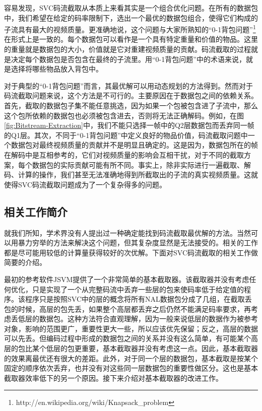 容易发现，SVC码流截取从本质上来看其实是一个组合优化问题。在所有的数据包中，我们希望在给定的码率限制下，选出一个最优的数据包组合，使得它们构成的子流具有最大的视频质量。更准确地说，这个问题与大家所熟知的“0-1背包问题”\footnote{http://en.wikipedia.org/wiki/Knapsack\_problem}在形式上是一致的。每个数据包可以看作是一个具有特定重量和价值的物品。这里的重量就是数据包的大小，价值就是它对重建视频质量的贡献。码流截取的过程就是决定每个数据包是否包含在最终的子流里。用“0-1背包问题”中的术语来说，就是选择将哪些物品放入背包中。

对于典型的“0-1背包问题”而言，其最优解可以用动态规划的方法得到。然而对于码流截取问题来说，这个方法是不可行的。主要原因在于数据包之间的依赖关系。首先，截取的数据包子集不能任意挑选，因为如果一个包被包含进了子流中，那么这个包所依赖的数据包也必须被包含进去，否则将无法正确解码。例如，在图\ref{fig:Bitstream-Extraction}中，我们不能只选择一帧中的Q2层数据包而丢弃同一帧的Q1层。其次，不同于“0-1背包问题”中定义良好的物品价值，码流截取问题中一个数据包对最终视频质量的贡献并不是明显且确定的。这是因为，数据包所在的帧在解码中是互相参考的，它们对视频质量的影响会互相干扰，对于不同的截取方案，每个数据包的实际贡献可能有所不同。事实上，除非实际进行一遍截取、解码、计算的操作，我们甚至无法准确地得到所截取出的子流的真实视频质量。这就使得SVC码流截取问题成为了一个复杂得多的问题。

\subsection{相关工作简介}

就我们所知，学术界没有人提出过一种确定能找到码流截取最优解的方法。当然可以用暴力穷举的方法来解决这个问题，但其复杂度显然是无法接受的。相关的工作都是尽可能用较低的计算量获得较好的次优解。下面对SVC码流截取的相关工作做简要的介绍。

最初的参考软件JSVM提供了一个非常简单的基本截取器。该截取器并没有考虑任何优化，只是实现了一个从完整码流中丢弃一些层的包来使码率低于给定值的程序。该程序只是按照SVC中的层的概念将所有NAL数据包分成了几组，在截取丢包的时候，高层的包先丢，如果整个高层都丢弃之后仍然不能满足码率要求，再考虑丢低层的数据包。这种方法符合直观理解，因为一般来说低层的数据作为被参考对象，影响的范围更广，重要性更大一些，所以应该优先保留；反之，高层的数据可以先丢。但编码过程中形成的数据包之间的关系并没有这么简单，有可能某个高层的包比某个低层的包更重要，基本截取器并没有考虑这一点。因此，基本截取器的效果离最优还有很大的差距。此外，对于同一个层的数据包，基本截取是按某个固定的顺序依次丢弃，也并没有对这些同一层数据包的重要性做区分。这也是基本截取器效率低下的另一个原因。接下来介绍对基本截取器的改进工作。

